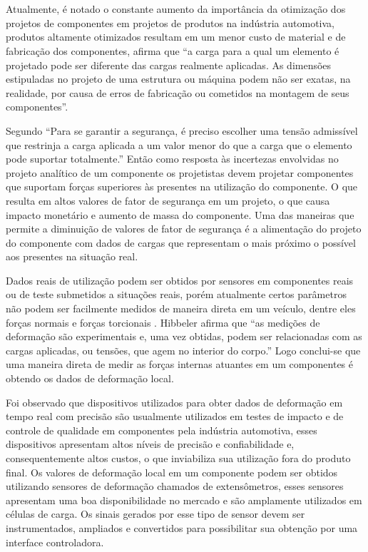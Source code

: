 

\chapter{}

Atualmente, é notado o constante aumento da importância da otimização dos projetos de componentes em projetos de produtos na indústria automotiva, produtos altamente otimizados resultam em um menor custo de material e de fabricação dos componentes, \autocite{Hibbeler2010} afirma que “a carga para a qual um elemento é projetado pode ser diferente das cargas realmente aplicadas. As dimensões estipuladas no projeto de uma estrutura ou máquina podem não ser exatas, na realidade, por causa de erros de fabricação ou cometidos na montagem de seus componentes”.

Segundo \autocite{Hibbeler2010} “Para se garantir a segurança, é preciso escolher uma tensão admissível que restrinja a carga aplicada a um valor menor do que a carga que o elemento pode suportar totalmente.” Então como resposta às incertezas envolvidas no projeto analítico de um componente os projetistas devem projetar componentes que suportam forças superiores às presentes na utilização do componente. O que resulta em altos valores de fator de segurança em um projeto, o que causa impacto monetário e aumento de massa do componente. Uma das maneiras que permite a diminuição de valores de fator de segurança é a alimentação do projeto do componente com dados de cargas que representam o mais próximo o possível aos presentes na situação real.

Dados reais de utilização podem ser obtidos por sensores em componentes reais ou de teste submetidos a situações reais, porém atualmente certos parâmetros não podem ser facilmente medidos de maneira direta em um veículo, dentre eles forças normais e forças torcionais \autocite{Nurprasetio2018}. Hibbeler afirma que “as medições de deformação são experimentais e, uma vez obtidas, podem ser relacionadas com as cargas aplicadas, ou tensões, que agem no interior do corpo.” Logo conclui-se que uma maneira direta de medir as forças internas atuantes em um componentes é obtendo os dados de deformação local.

Foi observado que dispositivos utilizados para obter dados de deformação em tempo real com precisão são usualmente utilizados em testes de impacto e de controle de qualidade em componentes pela indústria automotiva, esses dispositivos apresentam altos níveis de precisão e confiabilidade e, consequentemente altos custos, o que inviabiliza sua utilização fora do produto final. Os valores de deformação local em um componente podem ser obtidos utilizando sensores de deformação chamados de extensômetros, esses sensores apresentam uma boa disponibilidade no mercado e são amplamente utilizados em células de carga. Os sinais gerados por esse tipo de sensor devem ser instrumentados, ampliados e convertidos para possibilitar sua obtenção por uma interface controladora.

